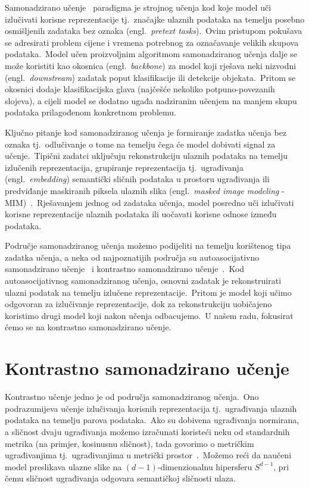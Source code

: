 \documentclass[diplomskirad]{fer}
\begin{document}
Samonadzirano učenje~\cite{jaiswal2020survey} paradigma je strojnog učenja kod koje model uči izlučivati korisne reprezentacije tj.\ značajke ulaznih podataka na temelju posebno osmišljenih zadataka bez oznaka (engl.\ \textit{pretext tasks}).\ 
Ovim pristupom pokušava se adresirati problem cijene i vremena potrebnog za označavanje velikih skupova podataka.\ 
Model učen proizvoljnim algoritmom samonadziranog učenja dalje se može koristiti kao okosnica (engl.\ \textit{backbone}) za model koji rješava neki nizvodni (engl.\ \textit{downstream}) zadatak poput klasifikacije ili detekcije objekata.\ 
Pritom se okosnici dodaje klasifikacijska glava (najčešće nekoliko potpuno-povezanih slojeva), a cijeli model se dodatno ugađa nadziranim učenjem na manjem skupu podataka prilagođenom konkretnom problemu.\ 
  
Ključno pitanje kod samonadziranog učenja je formiranje zadatka učenja bez oznaka tj.\ odlučivanje o tome na temelju čega će model dobivati signal za učenje.\ 
Tipični zadatci uključuju rekonstrukciju ulaznih podataka na temelju izlučenih reprezentacija, grupiranje reprezentacija tj.\ ugrađivanja (engl.\ \textit{embedding}) semantički sličnih podataka u prostoru ugrađivanja ili predviđanje maskiranih piksela ulaznih slika (engl.\ \textit{masked image modeling} - MIM)~\cite{hondru2024masked}.\
Rješavanjem jednog od zadataka učenja, model posredno uči izlučivati korisne reprezentacije ulaznih podataka ili uočavati korisne odnose između podataka.\ 
  
Područje samonadziranog učenja možemo podijeliti na temelju korištenog tipa zadatka učenja, a neka od najpoznatijih područja su autoasocijativno samonadzirano učenje~\cite{kramer1991nonlinear} i kontrastno samonadzirano učenje~\cite{jaiswal2020survey}.\ 
Kod autoasocijativnog samonadziranog učenja, osnovni zadatak je rekonstruirati ulazni podatak na temelju izlučene reprezentacije.\ Pritom je model koji učimo odgovoran za izlučivanje reprezentacije, dok za rekonstrukciju uobičajeno koristimo drugi model koji nakon učenja odbacujemo.\
U našem radu, fokusirat ćemo se na kontrastno samonadzirano učenje.\ 

\section{Kontrastno samonadzirano učenje}
\label{sek:contrastive}

Kontrastno učenje jedno je od područja samonadziranog učenja.\ Ono podrazumijeva učenje izlučivanja korisnih reprezentacija tj.\ ugrađivanja ulaznih podataka na temelju parova podataka.\ 
Ako su dobivena ugrađivanja normirana, a sličnost dvaju ugrađivanja možemo izračunati koristeći neku od standardnih metrika (na primjer, kosinusnu sličnost), tada govorimo o metričkim ugrađivanjima tj.\ ugrađivanjima u metrički prostor~\cite{chavez2001searching}.\ 
Možemo reći da naučeni model preslikava ulazne slike na $(d - 1)$-dimenzionalnu hipersferu $S^{d - 1}$, pri čemu sličnost ugrađivanja odgovara semantičkoj sličnosti ulaza.\
  
\end{document}
